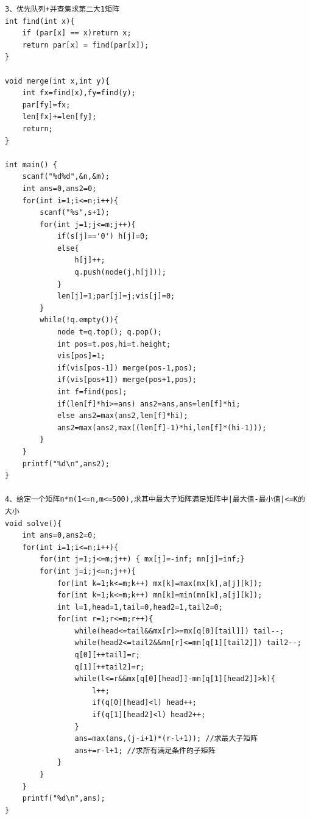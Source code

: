 \documentclass[twoside]{article}
\begin{document}
\begin{lstlisting}
3、优先队列+并查集求第二大1矩阵
int find(int x){
    if (par[x] == x)return x;
    return par[x] = find(par[x]);
}

void merge(int x,int y){
    int fx=find(x),fy=find(y);
    par[fy]=fx;
    len[fx]+=len[fy];
    return;
}

int main() {
    scanf("%d%d",&n,&m);
    int ans=0,ans2=0;
    for(int i=1;i<=n;i++){
        scanf("%s",s+1);
        for(int j=1;j<=m;j++){
            if(s[j]=='0') h[j]=0;
            else{
                h[j]++;
                q.push(node(j,h[j]));
            }
            len[j]=1;par[j]=j;vis[j]=0;
        }
        while(!q.empty()){
            node t=q.top(); q.pop();
            int pos=t.pos,hi=t.height;
            vis[pos]=1;
            if(vis[pos-1]) merge(pos-1,pos);
            if(vis[pos+1]) merge(pos+1,pos);
            int f=find(pos);
            if(len[f]*hi>=ans) ans2=ans,ans=len[f]*hi;
            else ans2=max(ans2,len[f]*hi);
            ans2=max(ans2,max((len[f]-1)*hi,len[f]*(hi-1)));
        }
    }
    printf("%d\n",ans2);
}

4、给定一个矩阵n*m(1<=n,m<=500),求其中最大子矩阵满足矩阵中|最大值-最小值|<=K的大小
void solve(){
    int ans=0,ans2=0;
    for(int i=1;i<=n;i++){
        for(int j=1;j<=m;j++) { mx[j]=-inf; mn[j]=inf;}
        for(int j=i;j<=n;j++){
            for(int k=1;k<=m;k++) mx[k]=max(mx[k],a[j][k]);
            for(int k=1;k<=m;k++) mn[k]=min(mn[k],a[j][k]);
            int l=1,head=1,tail=0,head2=1,tail2=0;
            for(int r=1;r<=m;r++){
                while(head<=tail&&mx[r]>=mx[q[0][tail]]) tail--;
                while(head2<=tail2&&mn[r]<=mn[q[1][tail2]]) tail2--;
                q[0][++tail]=r;
                q[1][++tail2]=r;
                while(l<=r&&mx[q[0][head]]-mn[q[1][head2]]>k){
                    l++;
                    if(q[0][head]<l) head++;
                    if(q[1][head2]<l) head2++;
                }
                ans=max(ans,(j-i+1)*(r-l+1)); //求最大子矩阵
                ans+=r-l+1; //求所有满足条件的子矩阵
            }
        }
    }
    printf("%d\n",ans);
}\end{lstlisting}
\end{document}
